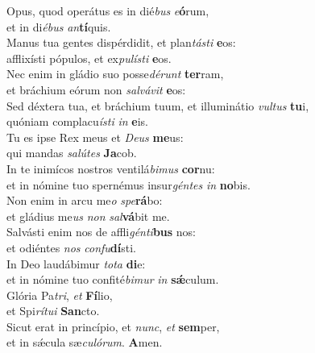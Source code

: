 \evenverse Opus, quod operátus es in dié\textit{bus} \textit{e}\textbf{ó}rum,~\*\\
\evenverse et in di\textit{é}\textit{bus} \textit{an}\textbf{tí}quis.\\
\oddverse Manus tua gentes dispérdidit, et plan\textit{tá}\textit{sti} \textbf{e}os:~\*\\
\oddverse afflixísti pópulos, et ex\textit{pu}\textit{lí}\textit{sti} \textbf{e}os.\\
\evenverse Nec enim in gládio suo posse\textit{dé}\textit{runt} \textbf{ter}ram,~\*\\
\evenverse et bráchium eórum non \textit{sal}\textit{vá}\textit{vit} \textbf{e}os:\\
\oddverse Sed déxtera tua, et bráchium tuum, et illuminátio \textit{vul}\textit{tus} \textbf{tu}i,~\*\\
\oddverse quóniam complacu\textit{í}\textit{sti} \textit{in} \textbf{e}is.\\
\evenverse Tu es ipse Rex meus et \textit{De}\textit{us} \textbf{me}us:~\*\\
\evenverse qui mandas \textit{sa}\textit{lú}\textit{tes} \textbf{Ja}cob.\\
\oddverse In te inimícos nostros ventilá\textit{bi}\textit{mus} \textbf{cor}nu:~\*\\
\oddverse et in nómine tuo spernémus insur\textit{gén}\textit{tes} \textit{in} \textbf{no}bis.\\
\evenverse Non enim in arcu me\textit{o} \textit{spe}\textbf{rá}bo:~\*\\
\evenverse et gládius me\textit{us} \textit{non} \textit{sal}\textbf{vá}bit me.\\
\oddverse Salvásti enim nos de affli\textit{gén}\textit{ti}\textbf{bus} nos:~\*\\
\oddverse et odiéntes \textit{nos} \textit{con}\textit{fu}\textbf{dí}sti.\\
\evenverse In Deo laudábimur \textit{to}\textit{ta} \textbf{di}e:~\*\\
\evenverse et in nómine tuo confité\textit{bi}\textit{mur} \textit{in} \textbf{sǽ}culum.\\
\oddverse Glória Pa\textit{tri}, \textit{et} \textbf{Fí}lio,~\*\\
\oddverse et Spi\textit{rí}\textit{tu}\textit{i} \textbf{San}cto.\\
\evenverse Sicut erat in princípio, et \textit{nunc}, \textit{et} \textbf{sem}per,~\*\\
\evenverse et in sǽcula sæ\textit{cu}\textit{ló}\textit{rum}. \textbf{A}men.\\
